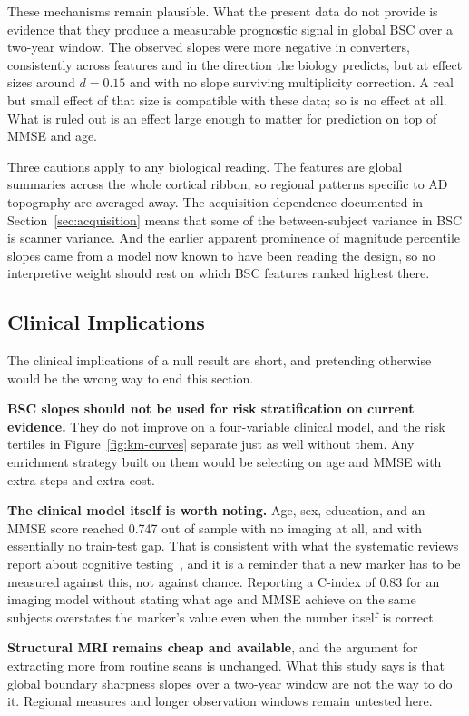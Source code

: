 \documentclass[blue]{ludusofficial}  %
\begin{document}
These mechanisms remain plausible. What the present data do not provide is evidence that they produce a measurable prognostic signal in global BSC over a two-year window. The observed slopes were more negative in converters, consistently across features and in the direction the biology predicts, but at effect sizes around $d=0.15$ and with no slope surviving multiplicity correction. A real but small effect of that size is compatible with these data; so is no effect at all. What is ruled out is an effect large enough to matter for prediction on top of MMSE and age.

Three cautions apply to any biological reading. The features are global summaries across the whole cortical ribbon, so regional patterns specific to AD topography are averaged away. The acquisition dependence documented in Section~\ref{sec:acquisition} means that some of the between-subject variance in BSC is scanner variance. And the earlier apparent prominence of magnitude percentile slopes came from a model now known to have been reading the design, so no interpretive weight should rest on which BSC features ranked highest there.

\subsection{Clinical Implications}

The clinical implications of a null result are short, and pretending otherwise would be the wrong way to end this section.

\textbf{BSC slopes should not be used for risk stratification on current evidence.} They do not improve on a four-variable clinical model, and the risk tertiles in Figure~\ref{fig:km-curves} separate just as well without them. Any enrichment strategy built on them would be selecting on age and MMSE with extra steps and extra cost.

\textbf{The clinical model itself is worth noting.} Age, sex, education, and an MMSE score reached 0.747 out of sample with no imaging at all, and with essentially no train-test gap. That is consistent with what the systematic reviews report about cognitive testing~\cite{ansart2021predicting,grueso2021machine}, and it is a reminder that a new marker has to be measured against this, not against chance. Reporting a C-index of 0.83 for an imaging model without stating what age and MMSE achieve on the same subjects overstates the marker's value even when the number itself is correct.

\textbf{Structural MRI remains cheap and available}, and the argument for extracting more from routine scans is unchanged. What this study says is that global boundary sharpness slopes over a two-year window are not the way to do it. Regional measures and longer observation windows remain untested here.
\end{document}
